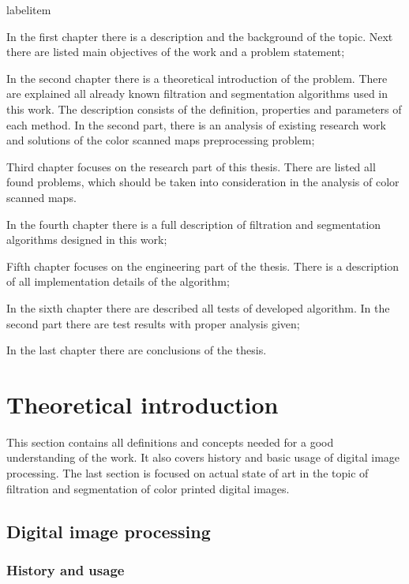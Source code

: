 \documentclass[a4paper,onecolumn,oneside,12pt]{memoir}
\makeatletter
\renewenvironment{itemize}{
  \begin{list}{  
  \csname labelitem\romannumeral\the\@listdepth\endcsname}{
  \setlength{\leftmargin}{1em}
	\setlength{\topsep}{6pt}%
	\setlength{\partopsep}{0pt}%
	\setlength{\parskip}{0pt}%
	\setlength{\parsep}{0pt}%
	\setlength{\itemsep}{0pt}}
}{
  \end{list}
}
\makeatother
\begin{document}
\begin{itemize}
  \item In the first chapter there is a description and the background of the topic.
        Next there are listed main objectives of the work and a problem statement;
  \item In the second chapter there is a theoretical introduction of the problem. There are
        explained all already known filtration and segmentation algorithms used in this work.
        The description consists of the definition, properties and parameters of each method. In the
        second part, there is an analysis of existing research work and solutions of the color
        scanned maps preprocessing problem;
  \item Third chapter focuses on the research part of this thesis. There are listed all found problems,
        which should be taken into consideration in the analysis of color scanned maps.
  \item In the fourth chapter there is a full description of filtration and segmentation algorithms
        designed in this work;
  \item Fifth chapter focuses on the engineering part of the thesis. There is a description of all
        implementation details of the algorithm;
  \item In the sixth chapter there are described all tests of developed algorithm. In the second part
        there are test results with proper analysis given;
  \item In the last chapter there are conclusions of the thesis.
\end{itemize}

\chapter{Theoretical introduction}

This section contains all definitions and concepts needed for a good understanding of the work. It
also covers history and basic usage of digital image processing. The last section is focused on
actual state of art in the topic of filtration and segmentation of color printed digital images.

\section{Digital image processing}

\subsection{History and usage}
\end{document}

